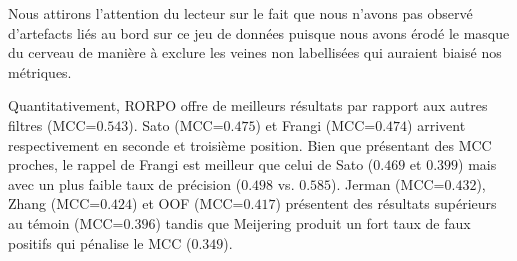 Nous attirons l'attention du lecteur sur le fait que nous n'avons pas observé d'artefacts liés au bord sur ce jeu de données puisque nous avons érodé le masque du cerveau de manière à exclure les veines non labellisées qui auraient biaisé nos métriques. 

Quantitativement, RORPO offre de meilleurs résultats par rapport aux autres filtres (MCC=$0.543$). Sato (MCC=$0.475$) et Frangi (MCC=$0.474$) arrivent respectivement en seconde et troisième position. Bien que présentant des MCC proches, le rappel de Frangi est meilleur que celui de Sato  ($0.469$ et $0.399$) mais avec un plus faible taux de précision ($0.498$ vs. $0.585$). Jerman (MCC=$0.432$), Zhang (MCC=$0.424$) et OOF (MCC=$0.417$) présentent des résultats supérieurs au témoin (MCC=$0.396$) tandis que Meijering produit un fort taux de faux positifs qui pénalise le MCC ($0.349$).

